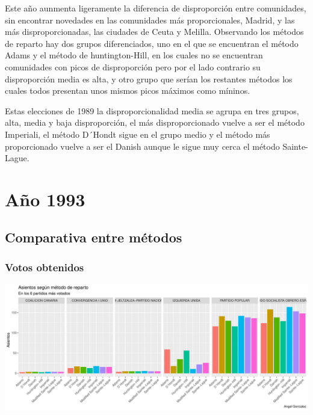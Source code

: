 \documentclass[12pt,a4paper,]{book}
\numberwithin{dummy}{section}
\theoremstyle{ocrenumbox}
\theoremstyle{blacknumex}
\theoremstyle{blacknumbox}
\theoremstyle{ocrenum}
\theoremstyle{ocrenum}
\begin{document}
Este año aunmenta ligeramente la diferencia de disproporción entre
comunidades, sin encontrar novedades en las comunidades más
proporcionales, Madrid, y las más disproporcionadas, las ciudades de
Ceuta y Melilla. Observando los métodos de reparto hay dos grupos
diferenciados, uno en el que se encuentran el método Adams y el método
de huntington-Hill, en los cuales no se encuentran comunidades con picos
de disproporción pero por el lado contrario su disproporción media es
alta, y otro grupo que serían los restantes métodos los cuales todos
presentan unos mismos picos máximos como míninos.

Estas elecciones de 1989 la disproporcionalidad media se agrupa en tres
grupos, alta, media y baja disproporción, el más disproporcionado vuelve
a ser el método Imperiali, el método D´Hondt sigue en el grupo medio y
el método más proporcionado vuelve a ser el Danish aunque le sigue muy
cerca el método Sainte-Lague.

\hypertarget{auxf1o-1993}{%
\section{Año 1993}\label{auxf1o-1993}}

\hypertarget{comparativa-entre-muxe9todos-5}{%
\subsection{Comparativa entre
métodos}\label{comparativa-entre-muxe9todos-5}}

\hypertarget{votos-obtenidos-5}{%
\subsubsection{Votos obtenidos}\label{votos-obtenidos-5}}

\begin{center}\includegraphics[width=0.95\linewidth]{figurasR/unnamed-chunk-56-1} \end{center}
\end{document}
